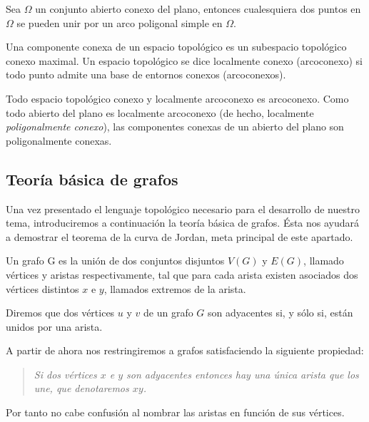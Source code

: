 \documentclass[12pt,a4paper,oldfontcommands]{memoir}
\begin{document}
\begin{lemma}
	Sea $\Omega$ un conjunto abierto conexo del plano, entonces cualesquiera dos puntos en $\Omega$ se pueden unir por un arco poligonal simple en $\Omega$. 
\end{lemma}

\begin{definition}
	Una componente conexa de un espacio topológico es un subespacio topológico conexo maximal. Un espacio topológico se dice localmente conexo (arcoconexo) si todo punto admite una base de entornos conexos (arcoconexos). 
\end{definition}
\begin{lemma}
Todo espacio topológico conexo y localmente arcoconexo es arcoconexo. Como todo abierto del plano es localmente arcoconexo (de hecho, localmente {\em poligonalmente conexo}), las componentes conexas de un abierto del plano son poligonalmente conexas. 
\end{lemma}

\subsection{Teoría básica de grafos}

Una vez presentado el lenguaje topológico necesario para el desarrollo de nuestro tema, introduciremos a continuación la teoría básica de grafos. Ésta nos ayudará a demostrar el teorema de la curva de Jordan, meta principal de este apartado.

\begin{definition}
	Un grafo G es la unión de dos conjuntos disjuntos $V(G)$ y $E(G)$, llamado vértices y aristas respectivamente, tal que para cada arista existen asociados dos vértices distintos $x$ e $y$, llamados extremos de la arista.
\end{definition}



\begin{definition}
	Diremos que dos vértices $u$ y $v$ de un grafo $G$ son adyacentes si, y sólo si, están unidos por una arista.
\end{definition}

A partir de ahora  nos restringiremos a grafos  satisfaciendo la siguiente propiedad: 
\begin{quote} {\em Si dos vértices $x$ e $y$   son adyacentes entonces hay una única arista que los une, que denotaremos $xy$.}
\end{quote}
Por tanto no cabe confusión al nombrar las aristas en función de sus vértices.
\end{document}
